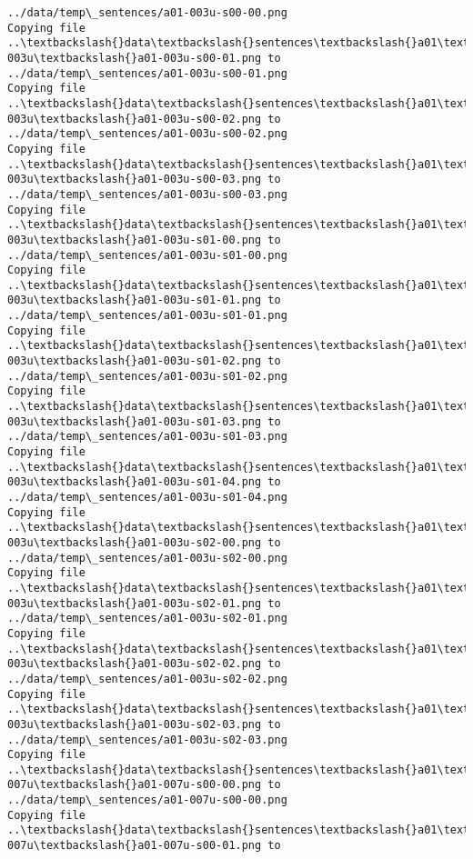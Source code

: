 \documentclass[11pt]{article}
\begin{document}
\begin{Verbatim}[commandchars=\\\{\}]
../data/temp\_sentences/a01-003u-s00-00.png
Copying file ..\textbackslash{}data\textbackslash{}sentences\textbackslash{}a01\textbackslash{}a01-003u\textbackslash{}a01-003u-s00-01.png to
../data/temp\_sentences/a01-003u-s00-01.png
Copying file ..\textbackslash{}data\textbackslash{}sentences\textbackslash{}a01\textbackslash{}a01-003u\textbackslash{}a01-003u-s00-02.png to
../data/temp\_sentences/a01-003u-s00-02.png
Copying file ..\textbackslash{}data\textbackslash{}sentences\textbackslash{}a01\textbackslash{}a01-003u\textbackslash{}a01-003u-s00-03.png to
../data/temp\_sentences/a01-003u-s00-03.png
Copying file ..\textbackslash{}data\textbackslash{}sentences\textbackslash{}a01\textbackslash{}a01-003u\textbackslash{}a01-003u-s01-00.png to
../data/temp\_sentences/a01-003u-s01-00.png
Copying file ..\textbackslash{}data\textbackslash{}sentences\textbackslash{}a01\textbackslash{}a01-003u\textbackslash{}a01-003u-s01-01.png to
../data/temp\_sentences/a01-003u-s01-01.png
Copying file ..\textbackslash{}data\textbackslash{}sentences\textbackslash{}a01\textbackslash{}a01-003u\textbackslash{}a01-003u-s01-02.png to
../data/temp\_sentences/a01-003u-s01-02.png
Copying file ..\textbackslash{}data\textbackslash{}sentences\textbackslash{}a01\textbackslash{}a01-003u\textbackslash{}a01-003u-s01-03.png to
../data/temp\_sentences/a01-003u-s01-03.png
Copying file ..\textbackslash{}data\textbackslash{}sentences\textbackslash{}a01\textbackslash{}a01-003u\textbackslash{}a01-003u-s01-04.png to
../data/temp\_sentences/a01-003u-s01-04.png
Copying file ..\textbackslash{}data\textbackslash{}sentences\textbackslash{}a01\textbackslash{}a01-003u\textbackslash{}a01-003u-s02-00.png to
../data/temp\_sentences/a01-003u-s02-00.png
Copying file ..\textbackslash{}data\textbackslash{}sentences\textbackslash{}a01\textbackslash{}a01-003u\textbackslash{}a01-003u-s02-01.png to
../data/temp\_sentences/a01-003u-s02-01.png
Copying file ..\textbackslash{}data\textbackslash{}sentences\textbackslash{}a01\textbackslash{}a01-003u\textbackslash{}a01-003u-s02-02.png to
../data/temp\_sentences/a01-003u-s02-02.png
Copying file ..\textbackslash{}data\textbackslash{}sentences\textbackslash{}a01\textbackslash{}a01-003u\textbackslash{}a01-003u-s02-03.png to
../data/temp\_sentences/a01-003u-s02-03.png
Copying file ..\textbackslash{}data\textbackslash{}sentences\textbackslash{}a01\textbackslash{}a01-007u\textbackslash{}a01-007u-s00-00.png to
../data/temp\_sentences/a01-007u-s00-00.png
Copying file ..\textbackslash{}data\textbackslash{}sentences\textbackslash{}a01\textbackslash{}a01-007u\textbackslash{}a01-007u-s00-01.png to

\end{Verbatim}
\end{document}

